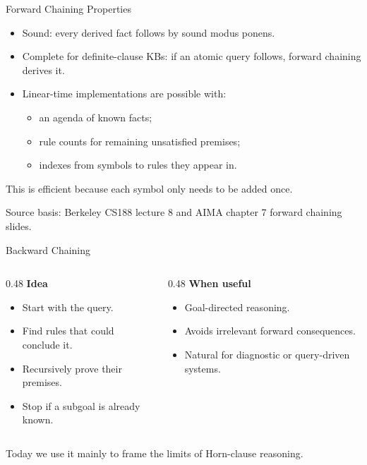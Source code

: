 \documentclass[aspectratio=169,11pt]{beamer}
\newcommand{\minihead}[1]{\textbf{\color{unswblue}#1}}
\newcommand{\source}[1]{\vfill{\scriptsize\color{darkgrey}Source basis: #1}}
\begin{document}
\begin{frame}{Forward Chaining Properties}
  \begin{itemize}
    \item Sound: every derived fact follows by sound modus ponens.
    \item Complete for definite-clause KBs: if an atomic query follows, forward chaining derives it.
    \item Linear-time implementations are possible with:
      \begin{itemize}
        \item an agenda of known facts;
        \item rule counts for remaining unsatisfied premises;
        \item indexes from symbols to rules they appear in.
      \end{itemize}
  \end{itemize}

  \vspace{0.7em}
  This is efficient because each symbol only needs to be added once.

  \source{Berkeley CS188 lecture 8 and AIMA chapter 7 forward chaining slides.}
\end{frame}

\begin{frame}{Backward Chaining}
  \begin{columns}[T,onlytextwidth]
    \begin{column}{0.48\textwidth}
      \minihead{Idea}
      \begin{itemize}
        \item Start with the query.
        \item Find rules that could conclude it.
        \item Recursively prove their premises.
        \item Stop if a subgoal is already known.
      \end{itemize}
    \end{column}
    \begin{column}{0.48\textwidth}
      \minihead{When useful}
      \begin{itemize}
        \item Goal-directed reasoning.
        \item Avoids irrelevant forward consequences.
        \item Natural for diagnostic or query-driven systems.
      \end{itemize}
    \end{column}
  \end{columns}

  \vspace{0.6em}
  Today we use it mainly to frame the limits of Horn-clause reasoning.
\end{frame}
\end{document}
